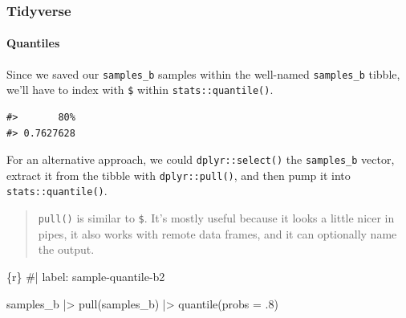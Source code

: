 \documentclass[
  letterpaper,
  DIV=11,
  numbers=noendperiod]{scrreprt}
\let\oldparagraph\paragraph
\renewcommand{\paragraph}[1]{\oldparagraph{#1}\mbox{}}
\newenvironment{Shaded}{\begin{snugshade}}{\end{snugshade}}
\newcommand{\AttributeTok}[1]{\textcolor[rgb]{0.40,0.45,0.13}{#1}}
\newcommand{\CommentTok}[1]{\textcolor[rgb]{0.37,0.37,0.37}{#1}}
\newcommand{\DecValTok}[1]{\textcolor[rgb]{0.68,0.00,0.00}{#1}}
\newcommand{\FunctionTok}[1]{\textcolor[rgb]{0.28,0.35,0.67}{#1}}
\newcommand{\InformationTok}[1]{\textcolor[rgb]{0.37,0.37,0.37}{#1}}
\newcommand{\NormalTok}[1]{\textcolor[rgb]{0.00,0.23,0.31}{#1}}
\newcommand{\OtherTok}[1]{\textcolor[rgb]{0.00,0.23,0.31}{#1}}
\newcommand{\SpecialCharTok}[1]{\textcolor[rgb]{0.37,0.37,0.37}{#1}}
\begin{document}
\hypertarget{tidyverse-12}{%
\subsubsection{Tidyverse}\label{tidyverse-12}}

\hypertarget{quantiles-1}{%
\paragraph{Quantiles}\label{quantiles-1}}

Since we saved our \texttt{samples\_b} samples within the well-named
\texttt{samples\_b} tibble, we'll have to index with \texttt{\$} within
\texttt{stats::quantile()}.

\begin{Shaded}
\end{Shaded}

\begin{verbatim}
#>       80% 
#> 0.7627628
\end{verbatim}

For an alternative approach, we could \texttt{dplyr::select()} the
\texttt{samples\_b} vector, extract it from the tibble with
\texttt{dplyr::pull()}, and then pump it into
\texttt{stats::quantile()}.

\begin{quote}
\texttt{pull()} is similar to \texttt{\$}. It's mostly useful because it
looks a little nicer in pipes, it also works with remote data frames,
and it can optionally name the output.
\end{quote}

\begin{Shaded}
\begin{Highlighting}[]
\InformationTok{\textasciigrave{}\textasciigrave{}\textasciigrave{}\{r\}}
\CommentTok{\#| label: sample{-}quantile{-}b2}

\NormalTok{samples\_b }\SpecialCharTok{|\textgreater{}} 
    \FunctionTok{pull}\NormalTok{(samples\_b) }\SpecialCharTok{|\textgreater{}} 
    \FunctionTok{quantile}\NormalTok{(}\AttributeTok{probs =}\NormalTok{ .}\DecValTok{8}\NormalTok{)}
    
\InformationTok{\textasciigrave{}\textasciigrave{}\textasciigrave{}}
\end{Highlighting}
\end{Shaded}
\end{document}
